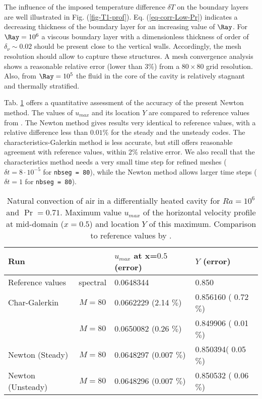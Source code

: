 The influence of the imposed temperature difference $\delta T$ on the boundary layers are well illustrated in Fig.  (\ref{fig-T1-prof}).
Eq. (\ref{eq-corr-Low-Pr}) indicates a decreasing thickness of the boundary layer for an increasing value of $\Ray$. 
For $\Ray = 10^6$ a viscous boundary layer with a dimensionless thickness of order of $\delta_\nu \sim 0.02$ should be present close to the vertical walls.
Accordingly, the mesh resolution should allow to capture these structures.
A mesh convergence analysis shows a reasonable relative error (lower than $3\%$) from a $80 \times 80$ grid resolution.
Also, from $\Ray = 10^5$ the fluid in the core of the cavity is relatively stagnant and thermally stratified.

Tab. \ref{tab-valid-natconv} offers a quantitative assessment of the accuracy of the present Newton method. 
The values of $u_{max}$  and its location $Y$ are compared to reference values from \cite{LeQuere91}. 
The Newton method gives results very identical to reference values, with a relative difference less than $0.01 \%$ for the steady and the unsteady codes. 
The characteristics-Galerkin method is less accurate, but still offers reasonable agreement with reference values, within 2$\%$ relative error. 
We also recall that the characteristics method needs a very small time step for refined meshes ($\delta t = 8\cdot 10^{-5}$ for \texttt{nbseg = 80}), while the Newton method allows larger time steps ($\delta t = 1$ for \texttt{nbseg = 80}). %
\begin{table}%
	\begin{center}
		\begin{tabular}{|l|c|l|l|}
			\hline
			\multicolumn{2}{|l|}{Run} & $u_{max}$ at x=$0.5$ (error) & $Y$ (error) \\
			\hline
			Reference values & spectral & 0.0648344           & 0.850 \\ \hline
			Char-Galerkin       &$M=80$ & 0.0662229 (2.14 $\%$) & 0.856160 ( 0.72 $\%$) \\ \hline
			\cite{dan-2014-JCP}              &$M=80$ & 0.0650082 (0.26 $\%$) & 0.849906 ( 0.01 $\%$) \\ \hline
			Newton (Steady)        &$M=80$ & 0.0648297 (0.007 $\%$) & 0.850394( 0.05 $\%$) \\ \hline
			Newton (Unsteady)        &$M=80$ & 0.0648296 (0.007 $\%$) & 0.850532 ( 0.06 $\%$) \\ \hline
		\end{tabular}
	\end{center}
	\caption {Natural convection of air in a differentially heated cavity for $Ra = 10^6$ and $\Pr = 0.71$. Maximum value $u_{max}$ of the horizontal velocity profile at mid-domain ($x=0.5$) and location $Y$ of this maximum. Comparison to reference values by \cite{LeQuere91}.}
	\label{tab-valid-natconv}
\end{table}

